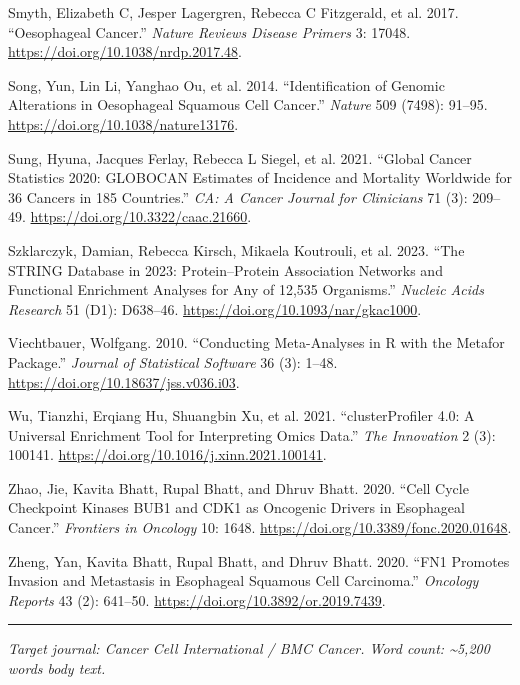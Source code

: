 \documentclass[
  12pt,
]{article}
\newlength{\cslhangindent}
\newenvironment{CSLReferences}[2] %
 {\begin{list}{}{%
  \setlength{\itemindent}{0pt}
  \setlength{\leftmargin}{0pt}
  \setlength{\parsep}{0pt}
  \ifodd #1
   \setlength{\leftmargin}{\cslhangindent}
   \setlength{\itemindent}{-1\cslhangindent}
  \fi
  \setlength{\itemsep}{#2\baselineskip}}}
 {\end{list}}
\begin{document}
\begin{CSLReferences}{1}{1}
Smyth, Elizabeth C, Jesper Lagergren, Rebecca C Fitzgerald, et al. 2017.
{``Oesophageal Cancer.''} \emph{Nature Reviews Disease Primers} 3:
17048. \url{https://doi.org/10.1038/nrdp.2017.48}.

Song, Yun, Lin Li, Yanghao Ou, et al. 2014. {``Identification of Genomic
Alterations in Oesophageal Squamous Cell Cancer.''} \emph{Nature} 509
(7498): 91--95. \url{https://doi.org/10.1038/nature13176}.

Sung, Hyuna, Jacques Ferlay, Rebecca L Siegel, et al. 2021. {``Global
Cancer Statistics 2020: {GLOBOCAN} Estimates of Incidence and Mortality
Worldwide for 36 Cancers in 185 Countries.''} \emph{CA: A Cancer Journal
for Clinicians} 71 (3): 209--49.
\url{https://doi.org/10.3322/caac.21660}.

Szklarczyk, Damian, Rebecca Kirsch, Mikaela Koutrouli, et al. 2023.
{``The {STRING} Database in 2023: Protein--Protein Association Networks
and Functional Enrichment Analyses for Any of 12,535 Organisms.''}
\emph{Nucleic Acids Research} 51 (D1): D638--46.
\url{https://doi.org/10.1093/nar/gkac1000}.

Viechtbauer, Wolfgang. 2010. {``Conducting Meta-Analyses in {R} with the
Metafor Package.''} \emph{Journal of Statistical Software} 36 (3):
1--48. \url{https://doi.org/10.18637/jss.v036.i03}.

Wu, Tianzhi, Erqiang Hu, Shuangbin Xu, et al. 2021. {``{clusterProfiler}
4.0: {A} Universal Enrichment Tool for Interpreting Omics Data.''}
\emph{The Innovation} 2 (3): 100141.
\url{https://doi.org/10.1016/j.xinn.2021.100141}.

Zhao, Jie, Kavita Bhatt, Rupal Bhatt, and Dhruv Bhatt. 2020. {``Cell
Cycle Checkpoint Kinases {BUB1} and {CDK1} as Oncogenic Drivers in
Esophageal Cancer.''} \emph{Frontiers in Oncology} 10: 1648.
\url{https://doi.org/10.3389/fonc.2020.01648}.

Zheng, Yan, Kavita Bhatt, Rupal Bhatt, and Dhruv Bhatt. 2020. {``{FN1}
Promotes Invasion and Metastasis in Esophageal Squamous Cell
Carcinoma.''} \emph{Oncology Reports} 43 (2): 641--50.
\url{https://doi.org/10.3892/or.2019.7439}.

\end{CSLReferences}

\begin{center}\rule{0.5\linewidth}{0.5pt}\end{center}

\emph{Target journal: Cancer Cell International / BMC Cancer. Word
count: \textasciitilde5,200 words body text.}
\end{document}
